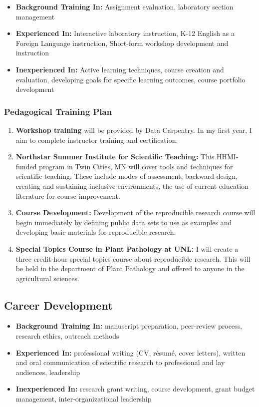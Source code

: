 \documentclass[12pt,letterpaper]{article}
\begin{document}
\begin{itemize}
  \item \textbf{Background Training In:} Assignment evaluation, laboratory section management
  \item \textbf{Experienced In:} Interactive laboratory instruction, K-12 English as a Foreign Language instruction, Short-form workshop development and
  instruction
  \item \textbf{Inexperienced In:} Active learning techniques, course creation and evaluation, developing goals for specific learning outcomes, course portfolio development
\end{itemize}

\subsubsection{Pedagogical Training Plan}

\begin{enumerate}
  \item \textbf{Workshop training} will be provided by Data Carpentry. In my first year, I aim to complete instructor training and certification.
  \item \textbf{Northstar Summer Institute for Scientific Teaching:} This HHMI-funded program in Twin Cities, MN will cover tools and techniques for scientific teaching. These include modes of assessment, backward design, creating and sustaining inclusive environments, the use of current education literature for course improvement.
  \item \textbf{Course Development:} Development of the reproducible research course will begin immediately by defining public data sets to use as examples and developing basic materials for reproducible research.
  \item \textbf{Special Topics Course in Plant Pathology at UNL:} I will create a three credit-hour special topics course about reproducible research. This will be held in the department of Plant Pathology and offered to anyone in the agricultural sciences. 
\end{enumerate}


\subsection{Career Development}

\begin{itemize}
  \item \textbf{Background Training In:} 
  manuscript preparation, peer-review process, research ethics, outreach methods
  \item \textbf{Experienced In:} 
  professional writing (CV, r\'esum\'e, cover letters), written and oral communication of scientific research to professional and lay audiences, leadership
  \item \textbf{Inexperienced In:} research grant writing, course development, grant budget management, inter-organizational leadership
\end{itemize}
\end{document}
